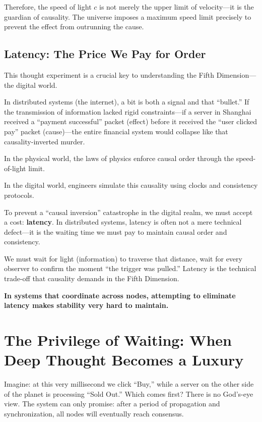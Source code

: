 \vspace{1em}

Therefore, the speed of light $c$ is not merely the upper limit of velocity---it is the guardian of causality.
The universe imposes a maximum speed limit precisely to prevent the effect from outrunning the cause.

\subsection{Latency: The Price We Pay for Order}

This thought experiment is a crucial key to understanding the Fifth Dimension---the digital world.

In distributed systems (the internet), a bit is both a signal and that ``bullet.'' If the transmission of information lacked rigid constraints---if a server in Shanghai received a ``payment successful'' packet (effect) before it received the ``user clicked pay'' packet (cause)---the entire financial system would collapse like that causality-inverted murder.

\vspace{1em}

In the physical world, the laws of physics enforce causal order through the speed-of-light limit.

In the digital world, engineers simulate this causality using clocks and consistency protocols.

To prevent a ``causal inversion'' catastrophe in the digital realm, we must accept a cost: \textbf{latency}.
In distributed systems, latency is often not a mere technical defect---it is the waiting time we must pay to maintain causal order and consistency.

\vspace{1em}

We must wait for light (information) to traverse that distance, wait for every observer to confirm the moment ``the trigger was pulled.''
Latency is the technical trade-off that causality demands in the Fifth Dimension.

\textbf{In systems that coordinate across nodes, attempting to eliminate latency makes stability very hard to maintain.}

\section{The Privilege of Waiting: When Deep Thought Becomes a Luxury}

Imagine: at this very millisecond we click ``Buy,'' while a server on the other side of the planet is processing ``Sold Out.'' Which comes first? There is no God's-eye view. The system can only promise: after a period of propagation and synchronization, all nodes will eventually reach consensus.

